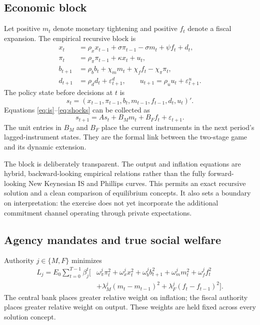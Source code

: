 \documentclass[11pt]{article}
\begin{document}
\subsection{Economic block}

Let positive $m_t$ denote monetary tightening and positive $f_t$ denote a
fiscal expansion.  The empirical recursive block is
\begin{align}
 x_t &= \rho_x x_{t-1}+\sigma\pi_{t-1}-\sigma m_t+\psi f_t+d_t,
                                                        \label{eq:is}\\
 \pi_t &= \rho_\pi\pi_{t-1}+\kappa x_t+u_t,             \label{eq:pc}\\
 b_{t+1} &= \rho_b b_t+\chi_m m_t+\chi_f f_t-\chi_\pi\pi_t,
                                                        \label{eq:debt}\\
 d_{t+1}&=\rho_d d_t+\varepsilon^d_{t+1},\qquad
 u_{t+1}=\rho_u u_t+\varepsilon^u_{t+1}.                \label{eq:shocks}
\end{align}
The policy state before decisions at $t$ is
\begin{equation}
 s_t=(x_{t-1},\pi_{t-1},b_t,m_{t-1},f_{t-1},d_t,u_t)'.   \label{eq:state}
\end{equation}
Equations \eqref{eq:is}--\eqref{eq:shocks} can be collected as
\begin{equation}
 s_{t+1}=A s_t+B_Mm_t+B_Ff_t+\varepsilon_{t+1}.          \label{eq:transition}
\end{equation}
The unit entries in $B_M$ and $B_F$ place the current instruments in the next
period's lagged-instrument states.  They are the formal link between the
two-stage game and its dynamic extension.

The block is deliberately transparent.  The output and inflation equations
are hybrid, backward-looking empirical relations rather than the fully
forward-looking New Keynesian IS and Phillips curves.  This permits an exact
recursive solution and a clean comparison of equilibrium concepts.  It also
sets a boundary on interpretation: the exercise does not yet incorporate the
additional commitment channel operating through private expectations.

\subsection{Agency mandates and true social welfare}

Authority $j\in\{M,F\}$ minimizes
\begin{align}
 L_j=E_0\sum_{t=0}^{T-1}\beta_j^t\big[&
 \omega^j_\pi\pi_t^2+\omega^j_xx_t^2+\omega^j_bb_{t+1}^2
 +\omega^j_m m_t^2+\omega^j_f f_t^2 \nonumber\\
 &+\lambda^j_M(m_t-m_{t-1})^2
 +\lambda^j_F(f_t-f_{t-1})^2\big].                    \label{eq:loss}
\end{align}
The central bank places greater relative weight on inflation; the fiscal
authority places greater relative weight on output.  These weights are held
fixed across every solution concept.
\end{document}
